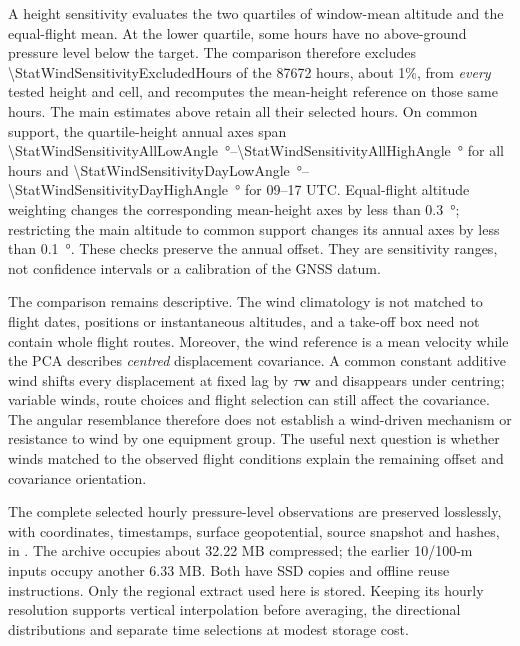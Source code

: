 A height sensitivity evaluates the two quartiles of window-mean altitude and
the equal-flight mean. At the lower quartile, some hours have no above-ground
pressure level below the target. The comparison therefore excludes
\num{\StatWindSensitivityExcludedHours} of the \num{87672} hours, about 1\%,
from \emph{every} tested height and cell, and recomputes the mean-height
reference on those same hours. The main estimates above retain all their
selected hours. On common support, the quartile-height annual axes span
\SI{\StatWindSensitivityAllLowAngle}{\degree}--\SI{\StatWindSensitivityAllHighAngle}{\degree}
for all hours and
\SI{\StatWindSensitivityDayLowAngle}{\degree}--\SI{\StatWindSensitivityDayHighAngle}{\degree}
for 09--17 UTC. Equal-flight altitude weighting changes the corresponding
mean-height axes by less than \SI{0.3}{\degree}; restricting the main altitude
to common support changes its annual axes by less than \SI{0.1}{\degree}.
These checks preserve the annual offset. They are sensitivity ranges, not
confidence intervals or a calibration of the GNSS datum.

The comparison remains descriptive. The wind climatology is not matched to
flight dates, positions or instantaneous altitudes, and a take-off box need
not contain whole flight routes. Moreover, the wind reference is a mean
velocity while the PCA describes \emph{centred} displacement covariance. A
common constant additive wind shifts every displacement at fixed lag by
$\tau\mathbf w$ and disappears under centring; variable winds, route choices
and flight selection can still affect the covariance. The angular resemblance
therefore does not establish a wind-driven mechanism or resistance to wind by
one equipment group. The useful next question is whether winds matched to
the observed flight conditions explain the remaining offset and covariance
orientation.

The complete selected hourly pressure-level observations are preserved
losslessly, with coordinates, timestamps, surface geopotential, source snapshot
and hashes, in
. The archive occupies
about 32.22 MB compressed; the earlier 10/100-m inputs occupy another 6.33 MB.
Both have SSD copies and offline reuse instructions. Only the regional extract
used here is stored. Keeping its hourly resolution supports vertical
interpolation before averaging, the directional distributions and separate
time selections at modest storage cost.
